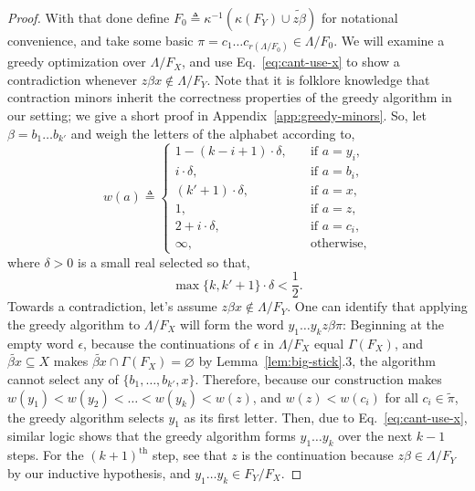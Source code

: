 \documentclass[11pt]{article}
\newcommand{\glang}{\Lambda}
\begin{document}
\begin{proof}
    With that done define $F_0 \triangleq \kappa^{-1}(\kappa(F_Y) \cup \widetilde{z\beta})$ for notational convenience, and take some basic $\pi = c_1\ldots c_{r(\glang/F_0)} \in \glang/F_0$.
    We will examine a greedy optimization over $\glang/F_X$, and use Eq.~\ref{eq:cant-use-x} to show a contradiction whenever $z\beta x \not\in\glang/F_Y$.
    Note that it is folklore knowledge that contraction minors inherit the correctness properties of the greedy algorithm in our setting; we give a short proof in Appendix~\ref{app:greedy-minors}.
    So, let $\beta = b_1\ldots b_{k'}$ and weigh the letters of the alphabet according to,
    \begin{equation*}
        w(a) \triangleq \begin{cases}
            1 - (k - i + 1)\cdot\delta,\quad&\text{if }a = y_i,\\
            i\cdot\delta,\quad&\text{if }a=b_i,\\
            (k'+1)\cdot\delta,\quad&\text{if }a=x,\\
            1,\quad&\text{if }a=z,\\
            2 + i\cdot\delta,\quad&\text{if }a=c_i,\\
            \infty,\quad&\text{otherwise},
        \end{cases}
    \end{equation*}
    where $\delta > 0$ is a small real selected so that,
    \begin{equation}\label{eq:delta-bound}
        \max\{k,k' + 1\}\cdot\delta < \frac{1}{2}.
    \end{equation}
    Towards a contradiction, let's assume $z\beta x \notin\glang/F_Y$.
    One can identify that applying the greedy algorithm to $\glang/F_X$ will form the word $y_1\ldots y_k z\beta\pi$:
    Beginning at the empty word $\epsilon$, because the continuations of $\epsilon$ in $\glang/F_X$ equal $\Gamma(F_X)$, and $\widetilde{\beta x}\subseteq X$ makes $\widetilde{\beta x}\cap\Gamma(F_X)=\varnothing$ by Lemma~\ref{lem:big-stick}.3, the algorithm cannot select any of $\{b_1,\ldots,b_{k'}, x\}$. 
    Therefore, because our construction makes $w(y_1) < w(y_2) < \ldots < w(y_k) < w(z)$, and $w(z) < w(c_i)$ for all $c_i \in \widetilde{\pi}$, the greedy algorithm selects $y_1$ as its first letter.
    Then, due to Eq.~\ref{eq:cant-use-x}, similar logic shows that the greedy algorithm forms $y_1\ldots y_k$ over the next $k-1$ steps.
    For the $(k+1)^\text{th}$ step, see that $z$ is the continuation because $z\beta \in \glang/F_Y$ by our inductive hypothesis, and $y_1\ldots y_k\in F_Y/F_X$.

\end{proof}
\end{document}
